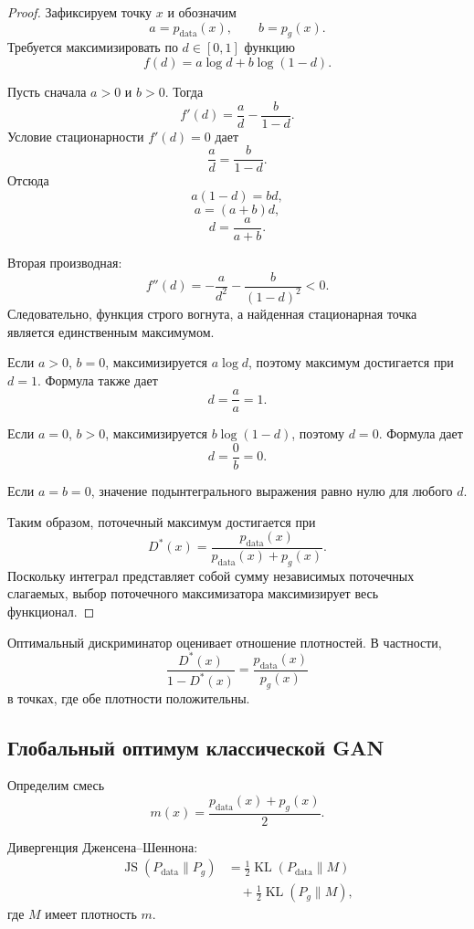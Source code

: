 \documentclass[12pt,a4paper]{article}
\newcommand{\KL}{\operatorname{KL}}
\newcommand{\JS}{\operatorname{JS}}
\numberwithin{equation}{section}
\theoremstyle{definition}
\theoremstyle{remark}
\begin{document}
\begin{proof}
Зафиксируем точку \(x\) и обозначим
\[
    a=p_{\mathrm{data}}(x),
    \qquad
    b=p_g(x).
\]
Требуется максимизировать по \(d\in[0,1]\) функцию
\[
    f(d)=a\log d+b\log(1-d).
\]

Пусть сначала \(a>0\) и \(b>0\). Тогда
\[
    f'(d)
    =
    \frac{a}{d}-\frac{b}{1-d}.
\]
Условие стационарности \(f'(d)=0\) дает
\[
    \frac{a}{d}
    =
    \frac{b}{1-d}.
\]
Отсюда
\[
    a(1-d)=bd,
\]
\[
    a=(a+b)d,
\]
\[
    d=\frac{a}{a+b}.
\]

Вторая производная:
\[
    f''(d)
    =
    -\frac{a}{d^2}
    -
    \frac{b}{(1-d)^2}<0.
\]
Следовательно, функция строго вогнута, а найденная стационарная точка
является единственным максимумом.

Если \(a>0\), \(b=0\), максимизируется \(a\log d\), поэтому максимум
достигается при \(d=1\). Формула также дает
\[
    d=\frac{a}{a}=1.
\]

Если \(a=0\), \(b>0\), максимизируется \(b\log(1-d)\), поэтому
\(d=0\). Формула дает
\[
    d=\frac{0}{b}=0.
\]

Если \(a=b=0\), значение подынтегрального выражения равно нулю для
любого \(d\).

Таким образом, поточечный максимум достигается при
\[
    D^*(x)
    =
    \frac{
        p_{\mathrm{data}}(x)
    }{
        p_{\mathrm{data}}(x)+p_g(x)
    }.
\]
Поскольку интеграл представляет собой сумму независимых поточечных
слагаемых, выбор поточечного максимизатора максимизирует весь
функционал.
\end{proof}

Оптимальный дискриминатор оценивает отношение плотностей. В частности,
\[
    \frac{D^*(x)}{1-D^*(x)}
    =
    \frac{p_{\mathrm{data}}(x)}{p_g(x)}
\]
в точках, где обе плотности положительны.

\subsection{Глобальный оптимум классической GAN}

Определим смесь
\[
    m(x)
    =
    \frac{
        p_{\mathrm{data}}(x)+p_g(x)
    }{2}.
\]

Дивергенция Дженсена--Шеннона:
\[
\begin{split}
    \JS(P_{\mathrm{data}}\|P_g)
    &=
    \frac{1}{2}
    \KL(P_{\mathrm{data}}\|M)\\
    &\quad+
    \frac{1}{2}
    \KL(P_g\|M),
\end{split}
\]
где \(M\) имеет плотность \(m\).
\end{document}
